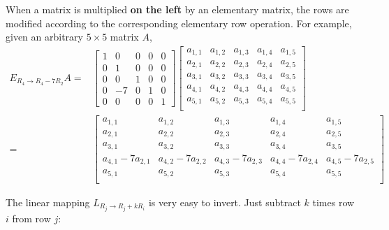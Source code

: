 \documentclass{article}
\begin{document}
When a matrix is multiplied {\bf on the left} by an elementary matrix, the rows are modified according to the corresponding elementary row operation. For example, given an arbitrary \(5 \times 5\) matrix \(A\),
\begin{align*}
E_{R_4 \rightarrow R_4 - 7R_2}A = & \begin{bmatrix} 
1 & 0 & 0 & 0 & 0 \\
0 & 1 & 0 & 0 & 0 \\
0 & 0 & 1 & 0 & 0 \\
0 & -7 & 0 & 1 & 0 \\
0 & 0 & 0 & 0 & 1
\end{bmatrix}\begin{bmatrix}
a_{1,1} & a_{1,2} & a_{1,3} & a_{1,4} & a_{1,5} \\ 
a_{2,1} & a_{2,2} & a_{2,3} & a_{2,4} & a_{2,5} \\ 
a_{3,1} & a_{3,2} & a_{3,3} & a_{3,4} & a_{3,5} \\ 
a_{4,1} & a_{4,2} & a_{4,3} & a_{4,4} & a_{4,5} \\ 
a_{5,1} & a_{5,2} & a_{5,3} & a_{5,4} & a_{5,5} \\ 
\end{bmatrix} \\
= & \begin{bmatrix}
a_{1,1} & a_{1,2} & a_{1,3} & a_{1,4} & a_{1,5} \\ 
a_{2,1} & a_{2,2} & a_{2,3} & a_{2,4} & a_{2,5} \\ 
a_{3,1} & a_{3,2} & a_{3,3} & a_{3,4} & a_{3,5} \\ 
a_{4,1} - 7a_{2,1} & a_{4,2} - 7a_{2,2} & a_{4,3} - 7a_{2,3} & a_{4,4} - 7a_{2,4} & a_{4,5} - 7a_{2,5} \\ 
a_{5,1} & a_{5,2} & a_{5,3} & a_{5,4} & a_{5,5} \\ 
\end{bmatrix}
\end{align*}

The linear mapping \(L_{R_j \rightarrow R_j + kR_i}\) is very easy to invert. Just subtract \(k\) times row \(i\) from row \(j\): 
\end{document}
